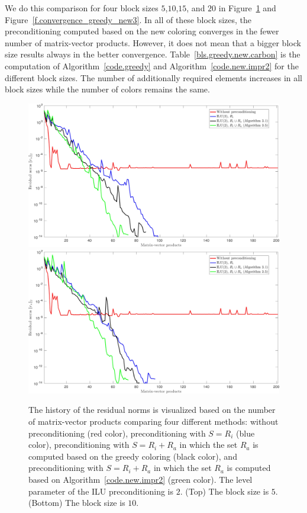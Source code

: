 \documentclass[12pt, twoside,a4paper,toc=bibliography]{scrbook}
\newcommand{\figref}[1]{Figure~\protect\ref{#1}}
\newcommand{\coderef}[1]{Algorithm~\protect\ref{#1}}
\begin{document}
We do this comparison for four block sizes $5$,$10$,$15$, and $20$ in
\figref{f.convergence_greedy_new2} and \figref{f.convergence_greedy_new3}.
In all of these block sizes, the preconditioning computed based
on the new coloring converges in the fewer number of matrix-vector products.
However, it does not mean that a bigger block size results always in the 
better convergence.
Table~\ref{bls.greedy.new.carbon} is the computation of \coderef{code.greedy} and 
\coderef{code.new.impr2} for the different block sizes.
The number of additionally required elements increases in all block sizes
while the number of colors remains the same.

\begin{figure}
\centering
\includegraphics[width=\linewidth]{jac_convergence_greedy_new_5.jpg}
\includegraphics[width=\linewidth]{jac_convergence_greedy_new_10.jpg}
\caption{
The history of the residual norms is visualized based on 
the number of matrix-vector products comparing four different methods:
without preconditioning (red color), 
preconditioning with $S=R_i$ (blue color),
preconditioning with $S=R_i + R_a$ in which 
the set $R_a$ is computed based on the greedy coloring (black color),
and preconditioning with $S=R_i + R_a$ in which 
the set $R_a$ is computed based on \coderef{code.new.impr2} (green color).
The level parameter of the ILU preconditioning is $2$.
(Top) The block size is $5$. 
(Bottom) The block size is $10$.
}
\label{f.convergence_greedy_new2}
\end{figure}
\end{document}
